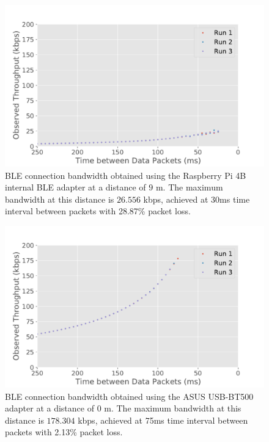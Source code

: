 \begin{figure}[H]
    \centering
    \includegraphics[width=0.75\linewidth]{images/ble-bandwidth-hci1-900cm.pdf}
    \caption[\acs{BLE} connection bandwidth obtained using the ASUS USB-BT500 adapter at a distance of 9 m.]{\acs{BLE} connection bandwidth obtained using the Raspberry Pi 4B internal \acs{BLE} adapter at a distance of $9\text{ m}$. The maximum bandwidth at this distance is $26.556$ kbps, achieved at 30ms time interval between packets with 28.87\% packet loss.}
    \label{fig:ble-bandwidth-hci1-9m}
\end{figure}

\begin{figure}[H]
    \centering
    \includegraphics[width=0.75\linewidth]{images/ble-bandwidth-hci0-0cm.pdf}
    \caption[\acs{BLE} connection bandwidth obtained using the ASUS USB-BT500 adapter at a distance of 0 m.]{\acs{BLE} connection bandwidth obtained using the ASUS USB-BT500 adapter at a distance of $0\text{ m}$. The maximum bandwidth at this distance is $178.304$ kbps, achieved at 75ms time interval between packets with 2.13\% packet loss.}
    \label{fig:ble-bandwidth-hci0-0m}
\end{figure}

